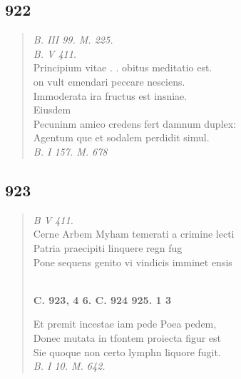 \documentclass[11pt, a4paper]{report}
\begin{document}
            \subsection*{922}
      \begin{verse}
      \textit{B. III 99. M. 225.} \\ \textit{B. V 411.} \\ Principium vitae . . obitus meditatio est. \\ on vult emendari peccare nesciens. \\ Immoderata ira fructus est insniae. \\ Eiusdem \\ Pecuninm amico credens fert damnum duplex: \\ Agentum \lbrack que \rbrack  et sodalem perdidit simul. \\ \textit{B. I 157. M. 678} \\ 
      \end{verse}
  
            \subsection*{923}
      \begin{verse}
      \textit{B V 411.} \\ Cerne Arbem Myham temerati a crimine lecti \\ Patria praecipiti linquere regn fug \\ Pone sequens genito vi vindicis imminet ensis \\ 
        ﻿\pagebreak 
     \marginpar{[348]} \begin{center} \textbf{C. 923, 4 6. C. 924 925. 1 3} \end{center}Et premit incestae iam pede Poea pedem, \\ Donec mutata in tfontem proiecta figur est \\ Sie quoque non certo lymphn liquore fugit. \\ \textit{B. I 10. M. 642.} \\ 
      \end{verse}
  
\end{document}
